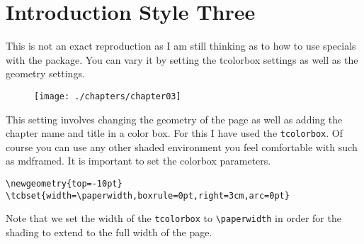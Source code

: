 



\chapter{Introduction Style Three}

This is not an exact reproduction as I am still thinking as to how to use
specials with the package. You can vary it by setting the tcolorbox settings as well as the geometry settings.
\medskip

\begin{figure}[ht]
\centering
\texttt{[image: ./chapters/chapter03]}
\end{figure}

This setting involves changing the geometry of the page as well as adding the chapter name and title in a color box. For this I have used the \lstinline{tcolorbox}. Of course you can use any other shaded environment you feel comfortable with such as mdframed. It is important to set the colorbox parameters.

\begin{lstlisting}
\newgeometry{top=-10pt}
\tcbset{width=\paperwidth,boxrule=0pt,right=3cm,arc=0pt}
\end{lstlisting}

Note that we set the width of the \lstinline{tcolorbox} to \lstinline{\paperwidth} in order for the shading to extend to the full width of the page.

\restoregeometry
